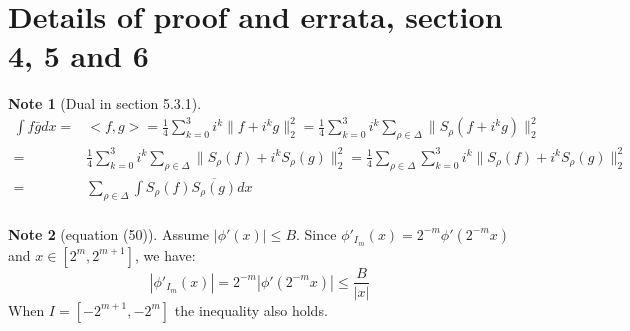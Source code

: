 \documentclass{report}
\theoremstyle{definition}
\newtheorem{note}{Note}
\theoremstyle{definition}
\theoremstyle{plain}
\numberwithin{theorem}{section}
\numberwithin{remark}{section}
\numberwithin{equation}{section}
\newcommand{\norm}[1]{\lVert#1\rVert}
\newcommand{\abs}[1]{\left\lvert#1\right\rvert}
\begin{document}
\section{Details of proof and errata, section 4, 5 and 6}
\begin{note}[Dual in section 5.3.1]
    \begin{align*}
        \int f\bar{g}dx=&<f,g>=\frac{1}{4}\sum_{k=0}^3 i^k\norm{f+i^kg}_2^2=\frac{1}{4}\sum_{k=0}^3 i^k\sum_{\rho\in \Delta}\norm{S_\rho(f+i^kg)}_2^2\\
        =&\frac{1}{4}\sum_{k=0}^3 i^k\sum_{\rho\in \Delta}\norm{S_\rho(f)+i^kS_{\rho}(g)}_2^2=\frac{1}{4}\sum_{\rho\in \Delta}\sum_{k=0}^3 i^k\norm{S_\rho(f)+i^kS_{\rho}(g)}_2^2\\
        =&\sum_{\rho\in \Delta} \int S_\rho(f)\overline{S_{\rho}(g)}dx\\
    \end{align*}
\end{note}
\begin{note}[equation (50)]
    Assume $\abs{\phi'(x)}\leq B$. Since $\phi'_{I_m}(x)=2^{-m}\phi'(2^{-m}x)$ and $x\in [2^m,2^{m+1}]$, we have:
\begin{equation*}
    \abs{\phi'_{I_m}(x)}=2^{-m}\abs{\phi'(2^{-m}x)}\leq \frac{B}{\abs{x}}
\end{equation*}
When $I=[-2^{m+1},-2^m]$ the inequality also holds.
\end{note}
\end{document}
